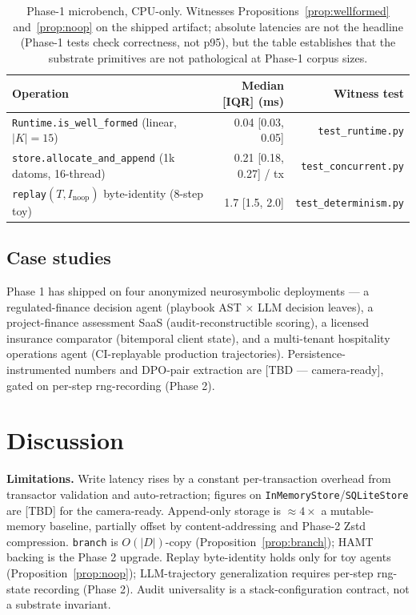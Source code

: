 \documentclass[anon]{nesy2026}   %
\newcommand{\C}[1]{\texttt{#1}}
\begin{document}
\begin{table}[ht]
\centering
\footnotesize
\begin{tabular}{lrr}
\toprule
\textbf{Operation} & \textbf{Median [IQR] (ms)} & \textbf{Witness test} \\
\midrule
\C{Runtime.is\_well\_formed} (linear, $|K|{=}15$) & 0.04 [0.03, 0.05] & \C{test\_runtime.py} \\
\C{store.allocate\_and\_append} (1k datoms, 16-thread) & 0.21 [0.18, 0.27] / tx & \C{test\_concurrent.py} \\
\C{replay}$(T, I_{\text{noop}})$ byte-identity (8-step toy) & 1.7 [1.5, 2.0] & \C{test\_determinism.py} \\
\bottomrule
\end{tabular}
\caption{Phase-1 microbench, CPU-only. Witnesses Propositions~\ref{prop:wellformed} and~\ref{prop:noop} on the shipped artifact; absolute latencies are not the headline (Phase-1 tests check correctness, not p95), but the table establishes that the substrate primitives are not pathological at Phase-1 corpus sizes.}
\label{tab:microbench}
\end{table}

\subsection{Case studies}\label{sec:eval-cases}

Phase 1 has shipped on four anonymized neurosymbolic deployments --- a regulated-finance decision agent (playbook AST $\times$ LLM decision leaves), a project-finance assessment SaaS (audit-reconstructible scoring), a licensed insurance comparator (bitemporal client state), and a multi-tenant hospitality operations agent (CI-replayable production trajectories). Persistence-instrumented numbers and DPO-pair extraction are [TBD --- camera-ready], gated on per-step rng-recording (Phase 2).

\section{Discussion}\label{sec:discussion}

\textbf{Limitations.} Write latency rises by a constant per-transaction overhead from transactor validation and auto-retraction; figures on \C{InMemoryStore}/\C{SQLiteStore} are [TBD] for the camera-ready. Append-only storage is $\approx 4\times$ a mutable-memory baseline, partially offset by content-addressing and Phase-2 Zstd compression. \C{branch} is $O(|D|)$-copy (Proposition~\ref{prop:branch}); HAMT backing is the Phase 2 upgrade. Replay byte-identity holds only for toy agents (Proposition~\ref{prop:noop}); LLM-trajectory generalization requires per-step rng-state recording (Phase 2). Audit universality is a stack-configuration contract, not a substrate invariant.
\end{document}

